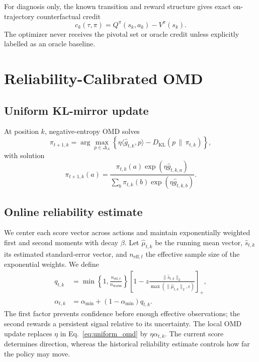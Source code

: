 \documentclass[10pt]{article}
\newcommand{\KL}{D_{\mathrm{KL}}}
\begin{document}
For diagnosis only, the known transition and reward structure gives exact
on-trajectory counterfactual credit
\begin{equation}
c_k(\tau,\pi)=Q^\pi(s_k,a_k)-V^\pi(s_k).
\end{equation}
The optimizer never receives the pivotal set or oracle credit unless explicitly
labelled as an oracle baseline.

\section{Reliability-Calibrated OMD}

\subsection{Uniform KL-mirror update}

At position $k$, negative-entropy OMD solves
\begin{equation}
\pi_{t+1,k}=\arg\max_{p\in\Delta_A}
\left\{\eta\langle \widehat g_{t,k},p\rangle
-\KL(p\,\|\,\pi_{t,k})\right\},
\end{equation}
with solution
\begin{equation}
\pi_{t+1,k}(a)=
\frac{\pi_{t,k}(a)\exp(\eta\widehat g_{t,k,a})}
{\sum_b\pi_{t,k}(b)\exp(\eta\widehat g_{t,k,b})}.
\label{eq:uniform_omd}
\end{equation}

\subsection{Online reliability estimate}

We center each score vector across actions and maintain exponentially weighted
first and second moments with decay $\beta$.  Let $\widehat\mu_{t,k}$ be the
running mean vector, $\widehat s_{t,k}$ its estimated standard-error vector,
and $n_{\mathrm{eff},t}$ the effective sample size of the exponential weights.
We define
\begin{align}
q_{t,k}
&=\min\left\{1,
\frac{n_{\mathrm{eff},t}}{n_{\mathrm{warm}}}
\right\}
\left[
1-z\frac{\|\widehat s_{t,k}\|_2}
{\max(\|\widehat\mu_{t,k}\|_2,\epsilon)}
\right]_+, \\
\alpha_{t,k}
&=\alpha_{\min}+(1-\alpha_{\min})q_{t,k}.
\label{eq:reliability}
\end{align}
The first factor prevents confidence before enough effective observations; the
second rewards a persistent signal relative to its uncertainty.  The local OMD
update replaces $\eta$ in Eq.~\eqref{eq:uniform_omd} by
$\eta\alpha_{t,k}$.  The current score determines direction, whereas the
historical reliability estimate controls how far the policy may move.
\end{document}
